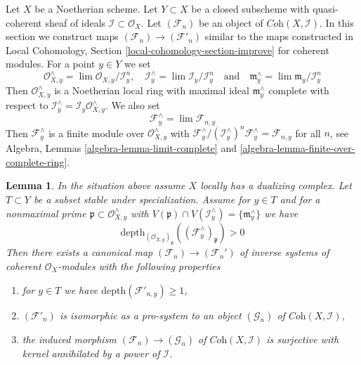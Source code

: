 \documentclass{stacks-project}
\theoremstyle{plain}
\newtheorem{lemma}[subsection]{Lemma}
\theoremstyle{definition}
\theoremstyle{remark}
\numberwithin{equation}{subsection}
\def\lim{\mathop{\mathrm{lim}}\nolimits}
\begin{document}
\noindent
Let $X$ be a Noetherian scheme. Let $Y \subset X$ be a closed subscheme
with quasi-coherent sheaf of ideals $\mathcal{I} \subset \mathcal{O}_X$.
Let $(\mathcal{F}_n)$ be an object of $\textit{Coh}(X, \mathcal{I})$.
In this section we construct maps
$(\mathcal{F}_n) \to (\mathcal{F}'_n)$
similar to the maps constructed in
Local Cohomology, Section \ref{local-cohomology-section-improve}
for coherent modules. For a point $y \in Y$ we set
$$
\mathcal{O}_{X, y}^\wedge = \lim \mathcal{O}_{X, y}/\mathcal{I}^n_y, \quad
\mathcal{I}_y^\wedge = \lim \mathcal{I}_y/\mathcal{I}^n_y
\quad\text{and}\quad
\mathfrak m_y^\wedge = \lim \mathfrak m_y/\mathcal{I}_y^n
$$
Then $\mathcal{O}_{X, y}^\wedge$ is a Noetherian local ring
with maximal ideal $\mathfrak m_y^\wedge$ complete with respect to
$\mathcal{I}_y^\wedge = \mathcal{I}_y\mathcal{O}_{X, y}^\wedge$.
We also set
$$
\mathcal{F}_y^\wedge = \lim \mathcal{F}_{n, y}
$$
Then $\mathcal{F}_y^\wedge$ is a finite module over
$\mathcal{O}_{X, y}^\wedge$ with
$\mathcal{F}_y^\wedge/(\mathcal{I}_y^\wedge)^n\mathcal{F}_y^\wedge =
\mathcal{F}_{n, y}$ for all $n$, see Algebra, Lemmas
\ref{algebra-lemma-limit-complete} and
\ref{algebra-lemma-finite-over-complete-ring}.

\begin{lemma}
\label{lemma-divide-torsion-formal-coherent-module}
In the situation above assume $X$ locally has a dualizing complex.
Let $T \subset Y$ be a subset stable under specialization.
Assume for $y \in T$ and for a nonmaximal prime
$\mathfrak p \subset \mathcal{O}_{X, y}^\wedge$ with
$V(\mathfrak p) \cap V(\mathcal{I}^\wedge_y) = \{\mathfrak m_y^\wedge\}$
we have
$$
\text{depth}_{(\mathcal{O}_{X, y})_\mathfrak p}
((\mathcal{F}^\wedge_y)_\mathfrak p) > 0
$$
Then there exists a canonical map
$(\mathcal{F}_n) \to (\mathcal{F}_n')$
of inverse systems of coherent $\mathcal{O}_X$-modules
with the following properties
\begin{enumerate}
\item for $y \in T$ we have $\text{depth}(\mathcal{F}'_{n, y}) \geq 1$,
\item $(\mathcal{F}'_n)$ is isomorphic as a pro-system to an object
$(\mathcal{G}_n)$ of $\textit{Coh}(X, \mathcal{I})$,
\item the induced morphism
$(\mathcal{F}_n) \to (\mathcal{G}_n)$ of
$\textit{Coh}(X, \mathcal{I})$ is surjective with kernel
annihilated by a power of $\mathcal{I}$.
\end{enumerate}
\end{lemma}
\end{document}
